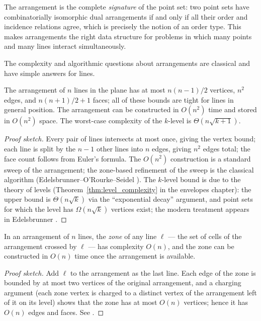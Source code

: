 The arrangement is the complete \emph{signature} of the point set: two point
sets have combinatorially isomorphic dual arrangements if and only if all
their order and incidence relations agree, which is precisely the notion of
an order type. This makes arrangements the right data structure for
problems in which many points and many lines interact simultaneously.

The complexity and algorithmic questions about arrangements are classical
and have simple answers for lines.

\begin{theorem}\label{thm:geo_duality_arrangement_complexity}
  The arrangement of $n$ lines in the plane has at most $n(n-1)/2$
  vertices, $n^2$ edges, and $n(n+1)/2 + 1$ faces; all of these bounds are
  tight for lines in general position. The arrangement can be constructed in
  $O(n^2)$ time and stored in $O(n^2)$ space. The worst-case complexity of
  the $k$-level is $\Theta(n\sqrt{k+1})$.
\end{theorem}

\begin{proof}[Proof sketch]
  Every pair of lines intersects at most once, giving the vertex bound;
  each line is split by the $n-1$ other lines into $n$ edges, giving $n^2$
  edges total; the face count follows from Euler's formula. The $O(n^2)$
  construction is a standard sweep of the arrangement; the zone-based
  refinement of the sweep is the classical algorithm
  (Edelsbrunner--O'Rourke--Seidel \cite{edelsbrunner1986}). The $k$-level
  bound is due to the theory of levels (Theorem~\ref{thm:level_complexity}
  in the envelopes chapter): the upper bound is $\Theta(n\sqrt{k})$ via the
  ``exponential decay'' argument, and point sets for which the level has
  $\Omega(n\sqrt{k})$ vertices exist; the modern treatment appears in
  Edelsbrunner \cite{edelsbrunner1987}.
\end{proof}

\begin{theorem}\label{thm:geo_duality_zone}
  In an arrangement of $n$ lines, the \emph{zone} of any line $\ell$
  --- the set of cells of the arrangement crossed by $\ell$ --- has
  complexity $O(n)$, and the zone can be constructed in $O(n)$ time once
  the arrangement is available.
\end{theorem}

\begin{proof}[Proof sketch]
  Add $\ell$ to the arrangement as the last line. Each edge of the zone is
  bounded by at most two vertices of the original arrangement, and a
  charging argument (each zone vertex is charged to a distinct vertex of the
  arrangement left of it on its level) shows that the zone has at most
  $O(n)$ vertices; hence it has $O(n)$ edges and faces. See
  \cite{edelsbrunner1986}.
\end{proof}

